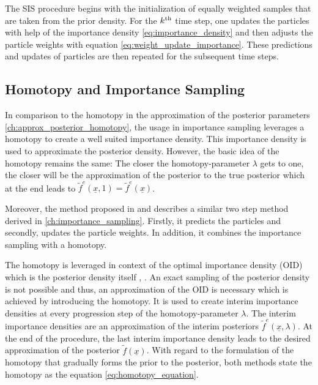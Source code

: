 \documentclass[a4paper]{IEEEtran}
\begin{document}
The SIS procedure begins with the initialization of equally weighted samples that are taken from the prior density. For the $k \textsuperscript{th}$ time step, one updates the particles with help of the importance density \eqref{eq:importance_density} and then adjusts the particle weights with equation \eqref{eq:weight_update_importance}. These predictions and updates of particles are then repeated for the subsequent time steps.

\subsection{Homotopy and Importance Sampling}
\label{ch:homotopy_importance_sampling}
In comparison to the homotopy in the approximation of the posterior parameters \ref{ch:approx_posterior_homotopy}, the usage in importance sampling leverages a homotopy 
to create a well suited importance density. This importance density is used to approximate the posterior density. However, the basic idea of the homotopy remains the same:
The closer the homotopy-parameter $\lambda$ gets to one, the closer will be the approximation of the posterior to the true posterior which at the end leads to $\tilde{f}^e(\underline{x}, 1) = \tilde{f}^{e}(\underline{x})$.

Moreover, the method proposed in \cite{bunch2013a} and \cite{chlebek2016a} describes a similar two step method derived in \ref{ch:importance_sampling}. Firstly, it predicts the particles and secondly, updates the particle weights. In addition, it combines the importance sampling with a homotopy.

The homotopy is leveraged in context of the optimal importance density (OID) which is the posterior density itself \cite{bunch2013a}, \cite{chlebek2016a}. An exact sampling of the posterior density is not possible and thus, an approximation of the OID is necessary which is achieved by introducing the homotopy.
It is used to create interim importance densities at every progression step of the homotopy-parameter $\lambda$. The interim importance densities are an approximation of the interim posteriors 
$\tilde{f}^{e}(\underline{x}, \lambda)$. At the end of the procedure, the last interim importance density leads to the desired approximation of the posterior $\tilde{f}(\underline{x})$. With regard to the formulation of the homotopy that gradually forms the prior to the posterior, both methods state the homotopy as the equation \eqref{eq:homotopy_equation}.
\end{document}
